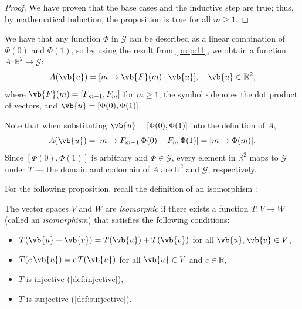\begin{enumerate}
\begin{enumerate}
\begin{proof}
                    We have proven that the base cases and the inductive step are true; thus, by mathematical induction, the proposition is true for all $m \ge 1$.
                \end{proof}

                \bigskip

                We have that any function $\Phi$ in $\mathscr{G}$ can be described as a linear combination of $\Phi(0)$ and $\Phi(1)$,
                so by using the result from \cref{prop:11}, we obtain a function $A: \mathbb{R}^2 \rightarrow \mathscr{G}$:
                \begin{equation} \label{eq:9}
                    A(\vb{u}) = [m \mapsto \vb{F}(m) \cdot \vb{u}], \quad \vb{u} \in \mathbb{R}^2,
                \end{equation}
                where $\vb{F}(m) = [F_{m - 1}, F_m]$ for $m \ge 1$, the symbol $\cdot$ denotes the dot product of vectors, and $\vb{u} = [\Phi(0), \Phi(1)]$.

                \smallskip

                Note that when substituting $\vb{u} = [\Phi(0), \Phi(1)]$ into the definition of $A$,
                \[
                    A(\vb{u}) = [m \mapsto F_{m - 1} \, \Phi(0) + F_m \, \Phi(1)] = [m \mapsto \Phi(m)].
                \]
                Since $[\Phi(0), \Phi(1)]$ is arbitrary and $\Phi \in \mathscr{G}$, every element in $\mathbb{R}^2$ maps to $\mathscr{G}$ under $T$ --- the domain and codomain of $A$ are $\mathbb{R}^2$ and $\mathscr{G}$, respectively.

                \medskip

                For the following proposition, recall the definition of an isomorphism \parencite{isomorphisms}:
                \begin{definition} \label{def:isomorphic}
                    The vector spaces $V$ and $W$ are \emph{isomorphic} if there exists a function $T: V \rightarrow W$ (called an \emph{isomorphism}) that satisfies the following conditions:
                    \begin{itemize}
                        \item $T(\vb{u} + \vb{v}) = T(\vb{u}) + T(\vb{v})$ for all $\vb{u}, \vb{v} \in V$,
                        \item $T(c \, \vb{u}) = c \, T(\vb{u})$ for all $\vb{u} \in V$ and $c \in \mathbb{R}$,
                        \item $T$ is injective (\cref{def:injective}),
                        \item $T$ is surjective (\cref{def:surjective}).
                    \end{itemize}
                \end{definition}


\end{enumerate}
\end{enumerate}
